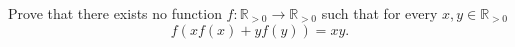 Prove that there exists no function $f\colon \mathbb{R}_{>0} \to \mathbb{R}_{>0}$ such that
for every $x,y\in\mathbb{R}_{>0}$
$$f(xf(x)+yf(y))=xy.$$
